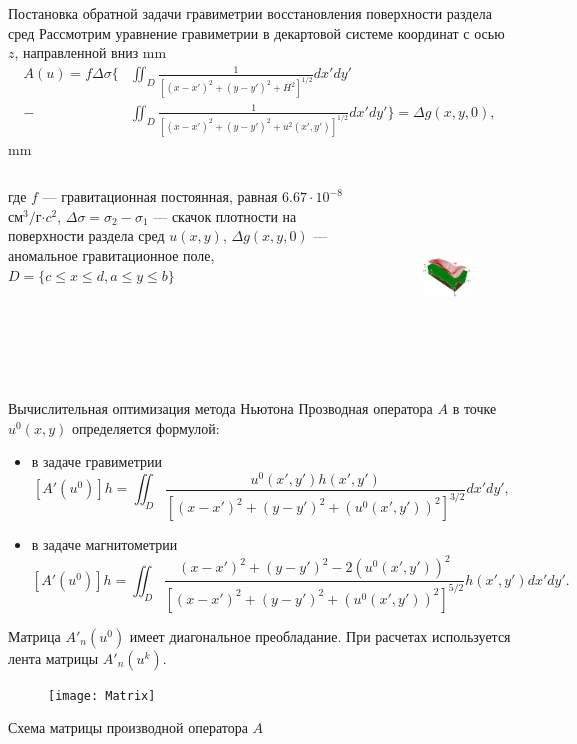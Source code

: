 \documentclass[10pt,pdf, mathserif, hyperref={unicode}]{beamer}
\begin{document}
\begin{frame}{Постановка обратной задачи гравиметрии восстановления поверхности раздела сред}
	Рассмотрим уравнение гравиметрии в декартовой системе координат с осью $z$, направленной вниз 
 mm
	\begin{equation*}
	\begin{aligned}
	A(u)=f\Delta\sigma \bigg\{ &\iint_{D} \frac{1}{[(x-x')^2+(y-y')^2+H^2]^{1/2}}dx'dy' \\
	- &\iint_{D} \frac{1}{[(x-x')^2+(y-y')^2+u^2(x',y')]^{1/2}}dx'dy'\bigg\}=\Delta g(x,y,0),
	\end{aligned} 
	\end{equation*}
 mm
	\begin{columns}
		где $f$ --- гравитационная постоянная, равная $6.67\cdot10^{-8}$ см$^3/$г$\cdot c^2$, $\Delta\sigma=\sigma_2-\sigma_1$ --- скачок плотности на поверхности раздела сред $u(x,y)$, $\Delta g(x,y,0)$ --- аномальное гравитационное поле,
		$D=\{c\leqslant x \leqslant d, a\leqslant y \leqslant b\}$
		\begin{figure}[h]
			\centering
			\includegraphics[height=4cm]{grav_illust.png}
			\label{fig:twolayer}
		\end{figure}
	\end{columns}
\end{frame}

\begin{frame}{Вычислительная оптимизация метода Ньютона}
	Прозводная оператора $A$ в точке $u^0(x,y)$ определяется формулой:
	\begin{itemize}
		\item в задаче гравиметрии
		$$ [A'(u^0)]h=\iint_{D} \frac{u^0(x',y')h(x',y')}{[(x-x')^2+(y-y')^2+(u^0(x',y'))^2]^{3/2}}dx'dy',$$
		\item в задаче магнитометрии
		$$ [A'(u^0)]h=\iint_{D} \frac{(x-x')^2+(y-y')^2-2(u^0(x',y'))^2}{[(x-x')^2+(y-y')^2+(u^0(x',y'))^2]^{5/2}}h(x',y')dx'dy'.$$
	\end{itemize}
	
	Матрица $A'_n(u^0)$ имеет диагональное преобладание.
	При расчетах используется лента матрицы $A'_n(u^k)$.
	\begin{figure}
		\texttt{[image: Matrix]}
	\end{figure}
	\centering \scriptsize Схема матрицы производной оператора $A$
\end{frame}
\end{document}
